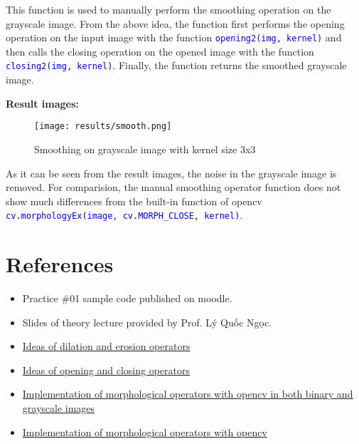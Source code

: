 \documentclass{report}
\begin{document}
This function is used to manually perform the smoothing operation on the grayscale image. From the above idea, the function first performs the opening operation on the input image with the function \textcolor{blue}{\lstinline|opening2(img, kernel)|} and then calls the closing operation on the opened image with the function \textcolor{blue}{\lstinline|closing2(img, kernel)|}. Finally, the function returns the smoothed grayscale image.

\textbf{Result images:}
\begin{figure}[H]
    \centering
    \texttt{[image: results/smooth.png]}
    \caption{Smoothing on grayscale image with kernel size 3x3}
\end{figure}

As it can be seen from the result images, the noise in the grayscale image is removed. For comparision, the manual smoothing operator function does not show much differences from the built-in function of opencv \textcolor{blue}{\lstinline|cv.morphologyEx(image, cv.MORPH_CLOSE, kernel)|}.

\pagebreak
\section{References}
\begin{itemize}
  \item[] Practice \#01 sample code published on moodle.
  \item[] Slides of theory lecture provided by Prof. Lý Quốc Ngọc.
  \item[] \href{https://www.mathworks.com/help/images/morphological-dilation-and-erosion.html}{Ideas of dilation and erosion operators}
  \item[] \href{http://users.utcluj.ro/~rdanescu/PI-L7e.pdf}{Ideas of opening and closing operators}
  \item[] \href{https://medium.com/@anshul16/dilation-morphological-operation-image-processing-82d16a619f59}{Implementation of morphological operators with opencv in both binary and grayscale images}
  \item[] \href{https://medium.com/@sasasulakshi/opencv-morphological-dilation-and-erosion-fab65c29efb3}{Implementation of morphological operators with opencv}
\end{itemize}
\end{document}
